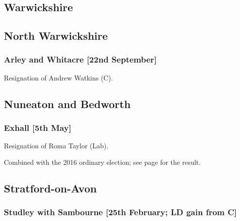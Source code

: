 \documentclass[a4paper,openany]{book}
\begin{document}
\begin{resultsiii}
\section{Warwickshire}

\subsection*{North Warwickshire}

\subsubsection*{Arley and Whitacre \hspace*{\fill}\nolinebreak[1]%
\enspace\hspace*{\fill}
[22nd September]}


Resignation of Andrew Watkins (C).

\subsection*{Nuneaton and Bedworth}

\subsubsection*{Exhall \hspace*{\fill}\nolinebreak[1]%
\enspace\hspace*{\fill}
[5th May]}


Resignation of Roma Taylor (Lab).

Combined with the 2016 ordinary election; see page \pageref{ExhallNuneatonBedworth} for the result.

\subsection*{Stratford-on-Avon}

\subsubsection*{Studley with Sambourne \hspace*{\fill}\nolinebreak[1]%
\enspace\hspace*{\fill}
[25th February; LD gain from C]}


\end{resultsiii}
\end{document}
